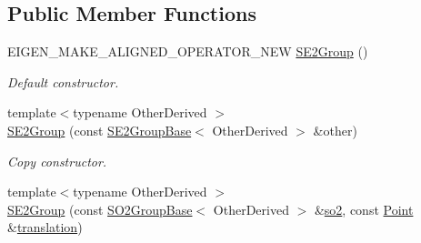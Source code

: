 \subsection*{Public Member Functions}
\begin{DoxyCompactItemize}
\item 
E\+I\+G\+E\+N\+\_\+\+M\+A\+K\+E\+\_\+\+A\+L\+I\+G\+N\+E\+D\+\_\+\+O\+P\+E\+R\+A\+T\+O\+R\+\_\+\+N\+EW \hyperlink{class_sophus_1_1_s_e2_group_acc6ff82594e8782f87206fe56368b843}{S\+E2\+Group} ()
\begin{DoxyCompactList}\small\item\em Default constructor. \end{DoxyCompactList}\item 
{\footnotesize template$<$typename Other\+Derived $>$ }\\\hyperlink{class_sophus_1_1_s_e2_group_ac28c38a52364c13b35294e4bf393c564}{S\+E2\+Group} (const \hyperlink{class_sophus_1_1_s_e2_group_base}{S\+E2\+Group\+Base}$<$ Other\+Derived $>$ \&other)\hypertarget{class_sophus_1_1_s_e2_group_ac28c38a52364c13b35294e4bf393c564}{}\label{class_sophus_1_1_s_e2_group_ac28c38a52364c13b35294e4bf393c564}

\begin{DoxyCompactList}\small\item\em Copy constructor. \end{DoxyCompactList}\item 
{\footnotesize template$<$typename Other\+Derived $>$ }\\\hyperlink{class_sophus_1_1_s_e2_group_aff6488a201f733b1742c81b4e8148c75}{S\+E2\+Group} (const \hyperlink{class_sophus_1_1_s_o2_group_base}{S\+O2\+Group\+Base}$<$ Other\+Derived $>$ \&\hyperlink{class_sophus_1_1_s_e2_group_a6f3c739ac63f076ce266409558ede468}{so2}, const \hyperlink{class_sophus_1_1_s_e2_group_a2c5e73ee0291af22e7cf6194caee546b}{Point} \&\hyperlink{class_sophus_1_1_s_e2_group_a6e63c40c66f69c7b363570a532b90aab}{translation})\hypertarget{class_sophus_1_1_s_e2_group_aff6488a201f733b1742c81b4e8148c75}{}\label{class_sophus_1_1_s_e2_group_aff6488a201f733b1742c81b4e8148c75}


\end{DoxyCompactItemize}

